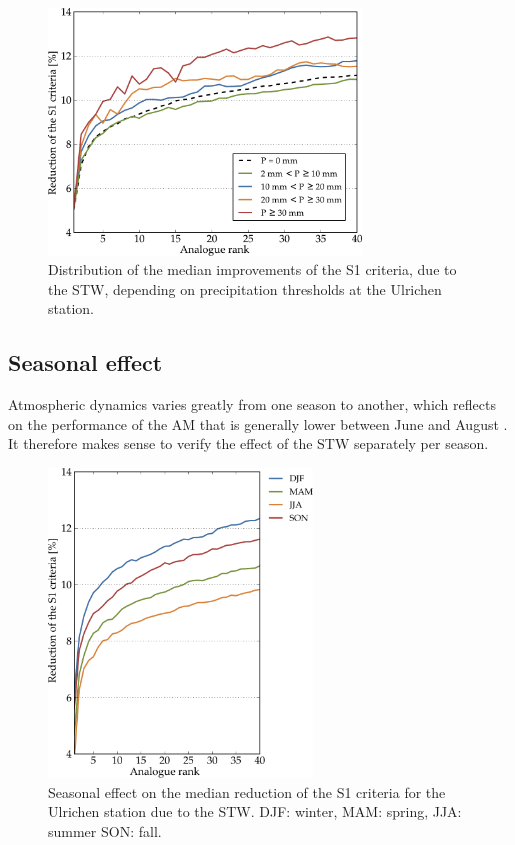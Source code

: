 \documentclass[hess]{copernicus}
\begin{document}
\begin{figure}[htb]
	\begin{center}
		\includegraphics[width=8.3cm]{figures/changes_S1_precip_threshold.pdf}
	\end{center}
	\caption{Distribution of the median improvements of the S1 criteria, due to the STW, depending on precipitation thresholds at the Ulrichen station.}
	\label{fig:changes_S1_precip_threshold}
\end{figure}


\subsection{Seasonal effect}
\label{sec:seasonal_effect}

Atmospheric dynamics varies greatly from one season to another, which reflects on the performance of the AM that is generally lower between June and August \citep{Bliefernicht2010}. It therefore makes sense to verify the effect of the STW separately per season.

\begin{figure}[htb]
	\begin{center}
		\includegraphics[width=7cm]{figures/changes_S1_seasons.pdf}
	\end{center}
	\caption{Seasonal effect on the median reduction of the S1 criteria for the Ulrichen station due to the STW. DJF: winter, MAM: spring, JJA: summer SON: fall.}
	\label{fig:changes_S1_seasons}
\end{figure}
\end{document}
